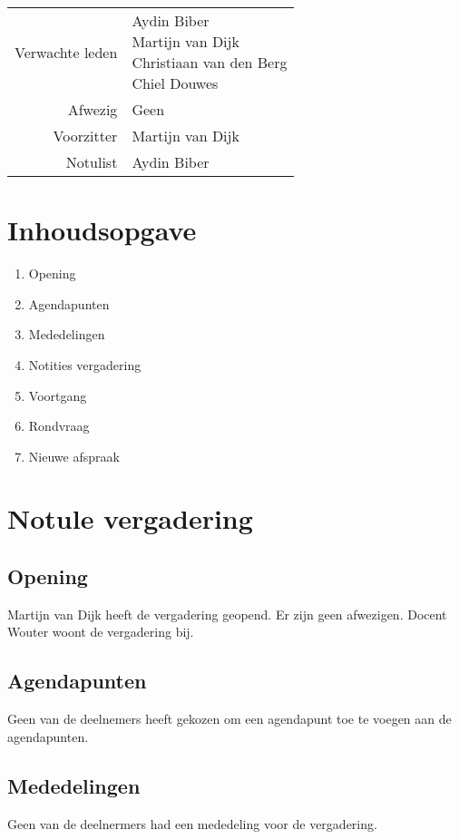 \documentclass[dutch]{hu}
\date{25 december 2015}
\subtitle{Notule 08-12-2015}
\begin{document}
\maketitle
\pagestyle{plain}

\begin{tabular}{ r | l }
Verwachte leden & \makecell[l]{
	Aydin Biber \\
	Martijn van Dijk \\
	Christiaan van den Berg \\
	Chiel Douwes
	} \\
Afwezig & Geen \\
Voorzitter & Martijn van Dijk \\
Notulist & Aydin Biber \\
\end{tabular}

\chapter{Inhoudsopgave}
\begin{enumerate}
\item Opening
\item Agendapunten
\item Mededelingen
\item Notities vergadering
\item Voortgang
\item Rondvraag
\item Nieuwe afspraak
\end{enumerate}

\chapter{Notule vergadering}
\section{Opening}
Martijn van Dijk heeft de vergadering geopend. Er zijn geen afwezigen.
Docent Wouter woont de vergadering bij.

\section{Agendapunten}
Geen van de deelnemers heeft gekozen om een agendapunt toe te voegen aan de agendapunten.

\section{Mededelingen}
Geen van de deelnermers had een mededeling voor de vergadering.
\end{document}
